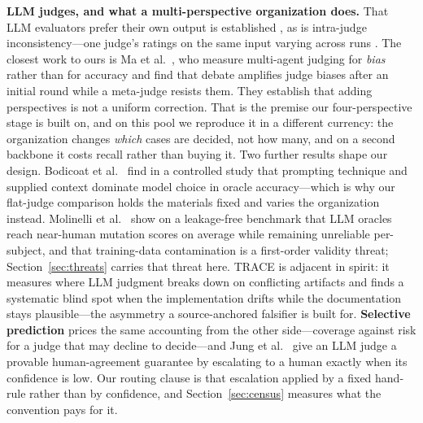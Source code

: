 \documentclass[acmsmall,screen,review,anonymous]{acmart}
\begin{document}
\textbf{LLM judges, and what a multi-perspective organization does.} That LLM evaluators prefer their
own output is established \cite{zheng23judge,panickssery24,wataoka24}, as is intra-judge
inconsistency---one judge's ratings on the same input varying across runs \cite{haldar25}. The
closest work to ours is Ma et al.\ \cite{manyminds25}, who measure multi-agent judging for
\emph{bias} rather than for accuracy and find that debate amplifies judge biases after an initial
round while a meta-judge resists them. They establish that adding perspectives is not a uniform
correction. That is the premise our four-perspective stage is built on, and on this pool we reproduce
it in a different currency: the organization changes \emph{which} cases are decided, not how many, and
on a second backbone it costs recall rather than buying it. Two further
results shape our design. Bodicoat et al.\ \cite{bodicoat25} find in a controlled study that
prompting technique and supplied context dominate model choice in oracle accuracy---which is why our
flat-judge comparison holds the materials fixed and varies the organization instead. Molinelli et
al.\ \cite{molinelli25} show on a leakage-free benchmark that LLM oracles reach near-human mutation
scores on average while remaining unreliable per-subject, and that training-data contamination is a
first-order validity threat; Section~\ref{sec:threats} carries that threat here. TRACE \cite{trace26}
is adjacent in spirit: it measures where LLM judgment
breaks down on conflicting artifacts and finds a systematic blind spot when the implementation drifts
while the documentation stays plausible---the asymmetry a source-anchored falsifier is built for.
\textbf{Selective prediction} prices the same accounting from the other side---coverage against risk
for a judge that may decline to decide---and Jung et al.\ \cite{trustorescalate25} give an LLM judge
a provable human-agreement guarantee by escalating to a human exactly when its confidence is low.
Our routing clause is that escalation applied by a fixed hand-rule rather than by confidence, and
Section~\ref{sec:census} measures what the convention pays for it.
\end{document}
